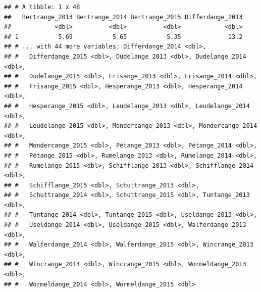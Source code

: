 \documentclass[]{gitbook}
\newenvironment{Shaded}{\begin{snugshade}}{\end{snugshade}}
\newcommand{\DataTypeTok}[1]{\textcolor[rgb]{0.13,0.29,0.53}{#1}}
\newcommand{\DecValTok}[1]{\textcolor[rgb]{0.00,0.00,0.81}{#1}}
\newcommand{\KeywordTok}[1]{\textcolor[rgb]{0.13,0.29,0.53}{\textbf{#1}}}
\newcommand{\NormalTok}[1]{#1}
\newcommand{\OperatorTok}[1]{\textcolor[rgb]{0.81,0.36,0.00}{\textbf{#1}}}
\newcommand{\StringTok}[1]{\textcolor[rgb]{0.31,0.60,0.02}{#1}}
\begin{document}
\begin{Shaded}
\end{Shaded}

\begin{verbatim}
## # A tibble: 1 x 48
##   Bertrange_2013 Bertrange_2014 Bertrange_2015 Differdange_2013
##            <dbl>          <dbl>          <dbl>            <dbl>
## 1           5.69           5.65           5.35             13.2
## # ... with 44 more variables: Differdange_2014 <dbl>,
## #   Differdange_2015 <dbl>, Dudelange_2013 <dbl>, Dudelange_2014 <dbl>,
## #   Dudelange_2015 <dbl>, Frisange_2013 <dbl>, Frisange_2014 <dbl>,
## #   Frisange_2015 <dbl>, Hesperange_2013 <dbl>, Hesperange_2014 <dbl>,
## #   Hesperange_2015 <dbl>, Leudelange_2013 <dbl>, Leudelange_2014 <dbl>,
## #   Leudelange_2015 <dbl>, Mondercange_2013 <dbl>, Mondercange_2014 <dbl>,
## #   Mondercange_2015 <dbl>, Pétange_2013 <dbl>, Pétange_2014 <dbl>,
## #   Pétange_2015 <dbl>, Rumelange_2013 <dbl>, Rumelange_2014 <dbl>,
## #   Rumelange_2015 <dbl>, Schifflange_2013 <dbl>, Schifflange_2014 <dbl>,
## #   Schifflange_2015 <dbl>, Schuttrange_2013 <dbl>,
## #   Schuttrange_2014 <dbl>, Schuttrange_2015 <dbl>, Tuntange_2013 <dbl>,
## #   Tuntange_2014 <dbl>, Tuntange_2015 <dbl>, Useldange_2013 <dbl>,
## #   Useldange_2014 <dbl>, Useldange_2015 <dbl>, Walferdange_2013 <dbl>,
## #   Walferdange_2014 <dbl>, Walferdange_2015 <dbl>, Wincrange_2013 <dbl>,
## #   Wincrange_2014 <dbl>, Wincrange_2015 <dbl>, Wormeldange_2013 <dbl>,
## #   Wormeldange_2014 <dbl>, Wormeldange_2015 <dbl>
\end{verbatim}
\end{document}

